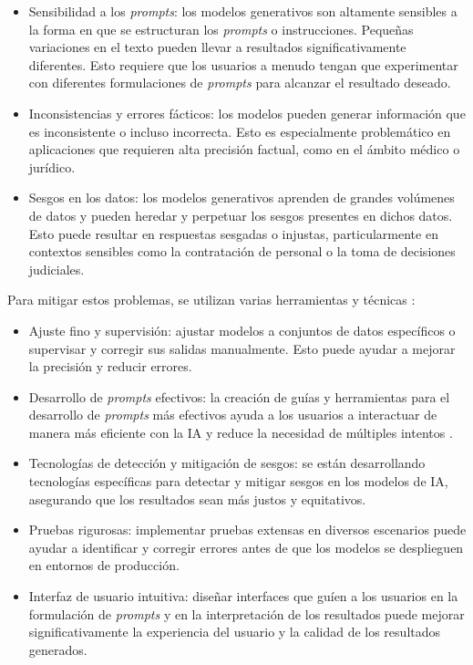 \begin{itemize}
    \item Sensibilidad a los \textit{prompts}: los modelos generativos son altamente sensibles a la forma en que se estructuran los \textit{prompts} o instrucciones. Pequeñas variaciones en el texto pueden llevar a resultados significativamente diferentes. Esto requiere que los usuarios a menudo tengan que experimentar con diferentes formulaciones de \textit{prompts} para alcanzar el resultado deseado.
    \item Inconsistencias y errores fácticos: los modelos pueden generar información que es inconsistente o incluso incorrecta. Esto es especialmente problemático en aplicaciones que requieren alta precisión factual, como en el ámbito médico o jurídico.
    \item Sesgos en los datos: los modelos generativos aprenden de grandes volúmenes de datos y pueden heredar y perpetuar los sesgos presentes en dichos datos. Esto puede resultar en respuestas sesgadas o injustas, particularmente en contextos sensibles como la contratación de personal o la toma de decisiones judiciales.
\end{itemize}

Para mitigar estos problemas, se utilizan varias herramientas y técnicas  \citep{TowardsAI2024}:

\begin{itemize}
    \item Ajuste fino y supervisión: ajustar modelos a conjuntos de datos específicos o supervisar y corregir sus salidas manualmente. Esto puede ayudar a mejorar la precisión y reducir errores.
    \item Desarrollo de \textit{prompts} efectivos: la creación de guías y herramientas para el desarrollo de \textit{prompts} más efectivos ayuda a los usuarios a interactuar de manera más eficiente con la IA y reduce la necesidad de múltiples intentos \citep{HatchWorks2024} \citep{arXiv2024Prompt}.
    \item Tecnologías de detección y mitigación de sesgos: se están desarrollando tecnologías específicas para detectar y mitigar sesgos en los modelos de IA, asegurando que los resultados sean más justos y equitativos.
    \item Pruebas rigurosas: implementar pruebas extensas en diversos escenarios puede ayudar a identificar y corregir errores antes de que los modelos se desplieguen en entornos de producción.
    \item Interfaz de usuario intuitiva: diseñar interfaces que guíen a los usuarios en la formulación de \textit{prompts} y en la interpretación de los resultados puede mejorar significativamente la experiencia del usuario y la calidad de los resultados generados.
\end{itemize}

